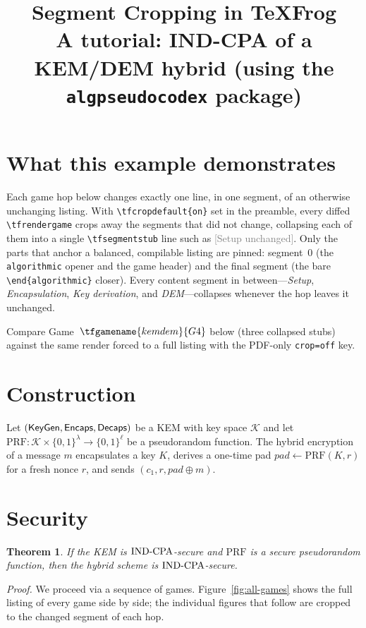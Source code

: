 \documentclass{article}
\title{Segment Cropping in TeXFrog\\
{\large A tutorial: IND-CPA of a KEM/DEM hybrid (using the \texttt{algpseudocodex} package)}}
\author{}
\date{}
\newtheorem{theorem}{Theorem}
\begin{document}
\maketitle

\section{What this example demonstrates}

Each game hop below changes exactly one line, in one segment, of an otherwise
unchanging listing. With \verb|\tfcropdefault{on}| set in the preamble, every
diffed \verb|\tfrendergame| crops away the segments that did not change,
collapsing each of them into a single \verb|\tfsegmentstub| line such as
\textcolor{gray}{[Setup unchanged]}. Only the parts that anchor a balanced,
compilable listing are pinned: segment~0 (the \verb|algorithmic| opener and the
game header) and the final segment (the bare \verb|\end{algorithmic}| closer).
Every content segment in between---\emph{Setup}, \emph{Encapsulation},
\emph{Key derivation}, and \emph{DEM}---collapses whenever the hop leaves it
unchanged.

Compare Game~$\tfgamename{kemdem}{G4}$ below (three collapsed stubs) against the
same render forced to a full listing with the PDF-only \verb|crop=off| key.

\section{Construction}

Let $(\mathsf{KeyGen}, \mathsf{Encaps}, \mathsf{Decaps})$ be a KEM with key space $\mathcal{K}$
and let $\mathrm{PRF}\colon \mathcal{K} \times \{0,1\}^\lambda \to \{0,1\}^{\ell}$
be a pseudorandom function. The hybrid encryption of a message $m$ encapsulates
a key $K$, derives a one-time pad $\mathit{pad} \gets \mathrm{PRF}(K, r)$ for a
fresh nonce $r$, and sends $(c_1, r, \mathit{pad} \oplus m)$.

\section{Security}

\begin{theorem}
If the KEM is $\mathrm{IND\text{-}CPA}$-secure and $\mathrm{PRF}$ is a secure pseudorandom
function, then the hybrid scheme is $\mathrm{IND\text{-}CPA}$-secure.
\end{theorem}

\noindent\textit{Proof.}\quad
We proceed via a sequence of games. Figure~\ref{fig:all-games} shows the full
listing of every game side by side; the individual figures that follow are
cropped to the changed segment of each hop.
\end{document}
